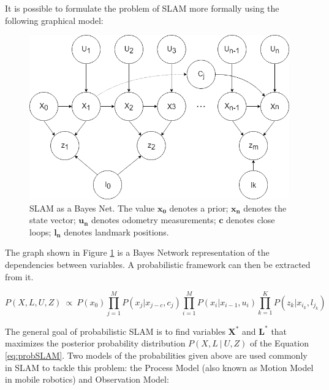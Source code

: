 \documentclass[12pt]{article}
\begin{document}
It is possible to formulate the problem of SLAM more formally using the following graphical model:

\begin{figure}
\begin{minipage}{0.65\textwidth}
\centering
\includegraphics[width=\textwidth]{BayesNetSLAM}
\end{minipage} \hfill
\begin{minipage}{0.35\textwidth}
\centering
\caption{SLAM as a Bayes Net. The value $\mathbf{x_0}$ denotes a prior; $\mathbf{x_n}$ denotes the state vector; $\mathbf{u_n}$ denotes odometry measurements; $\mathbf{c}$ denotes close loops; $\mathbf{l_n}$ denotes landmark positions.}
\label{fig:slam1}
\end{minipage}				
\end{figure}
	
The graph shown in Figure \ref{fig:slam1} is a Bayes Network representation of the dependencies between variables. A probabilistic framework can then be extracted from it. 

\begin{equation}
P(X,L,U,Z)\ \propto \ P(x_0)\prod_{j=1}^{M}P(x_j|x_{j-c},c_j)\prod_{i=1}^{M}P(x_i|x_{i-1}, u_i)\prod_{k=1}^{K}P(z_k|x_{i_k},l_{j_k})
\label{eq:probSLAM}
\end{equation}

The general goal of probabilistic SLAM is to find variables $\mathbf{X^*}$ and $\mathbf{L^*}$ that maximizes the posterior probability distribution $P(X,L\ |\ U, Z)$ of the Equation \ref{eq:probSLAM}. Two models of the probabilities given above are used commonly in SLAM to tackle this problem: the Process Model (also known as Motion Model in mobile robotics) and Observation Model:
	
\end{document}
